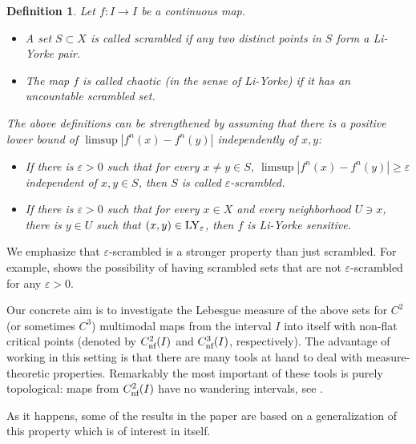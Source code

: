 \documentclass[12pt, psamsfonts, reqno]{amsart}
\newtheorem{definition}[theorem]{Definition}
\begin{document}
\begin{definition}
Let $f:I \to I$ be a continuous map.
\begin{itemize}
 \item A set $S \subset X$ is called {\em scrambled} if any two
distinct points in $S$ form a Li-Yorke pair.
 \item The map $f$ is called \emph{chaotic (in the sense of Li-Yorke)} if it has
an uncountable scrambled set.
\end{itemize}
 \iffalse $\bullet$ A map $f$ is
{\em spatio-temporally chaotic} if for every $x \in X$ and
neighborhood $U \owns x$, there is $y \in U$ such that $(x,y) \in
{\mathop{\rm LY}\nolimits}$.  \fi

The above definitions can be strengthened by assuming that there
is a positive lower bound of $\limsup |f^n(x) - f^n(y)|$
independently of $x,y$:
\begin{itemize}
 \item If there is ${\varepsilon} > 0$ such that for every $x \neq y \in S$,
$\limsup |f^n(x) - f^n(y)| \geq {\varepsilon}$ independent of $x,y \in
S$, then $S$ is called {\em ${\varepsilon}$-scrambled}.
 \item If there is ${\varepsilon} > 0$ such that for every $x \in X$
and every neighborhood $U \owns x$, there is $y \in U$ such that
$(x,y) \in {\mathop{\rm LY}\nolimits}_{\varepsilon}$, then $f$ is {\em Li-Yorke sensitive}.
\end{itemize}
\end{definition}

We emphasize that ${\varepsilon}$-scrambled is a stronger property than
just scrambled. For example, \cite[Proposition 5]{BHS} shows the
possibility of having scrambled sets that are not ${\varepsilon}$-scrambled
for any ${\varepsilon} > 0$.

Our concrete aim is to investigate the Lebesgue measure of the
above sets for $C^2$ (or sometimes $C^3$) multimodal maps from the
interval $I$ into itself with non-flat critical points (denoted by
${C^2_{\text{\rm nf}}}(I)$ and ${C^3_{\text{\rm nf}}}(I)$, respectively). The advantage of
working in this setting is that there are many tools at hand to
deal with measure-theoretic properties. Remarkably the most
important of these tools is purely topological: maps from
${C^2_{\text{\rm nf}}}(I)$ have no wandering intervals, see \cite[Theorem A, p.
267]{dMvS}.

As it happens, some of the results in the paper are based on a
generalization of this property which is of interest in itself.
\end{document}
